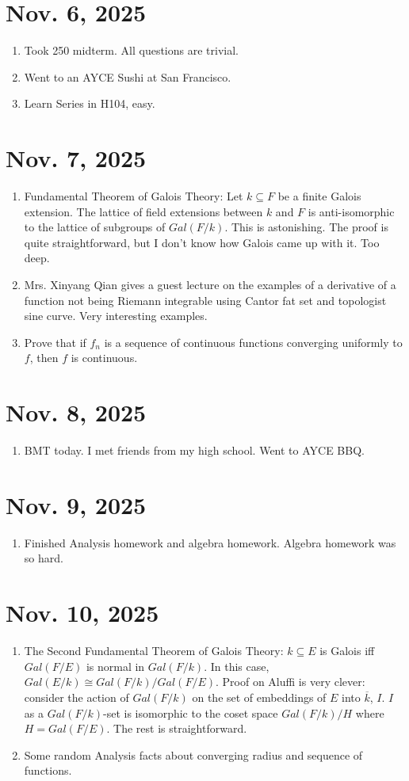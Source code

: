 \documentclass[15pt]{scrartcl}
\begin{document}
\section{Nov. 6, 2025}
\begin{enumerate}
\item Took 250 midterm. All questions are trivial. 
\item Went to an AYCE Sushi at San Francisco.
\item Learn Series in H104, easy. 
\end{enumerate}
\section{Nov. 7, 2025}
\begin{enumerate}
\item Fundamental Theorem of Galois Theory: Let $k\subseteq F$ be a finite Galois extension. The lattice of field extensions between $k$ and $F$ is anti-isomorphic to the lattice of subgroups of $Gal(F/k)$. This is astonishing. The proof is quite straightforward, but I don't know how Galois came up with it. Too deep.  
\item Mrs. Xinyang Qian gives a guest lecture on the examples of a derivative of a function not being Riemann integrable using Cantor fat set and topologist sine curve. Very interesting examples. 
\item Prove that if $f_n$ is a sequence of continuous functions converging uniformly to $f$, then $f$ is continuous. 
\end{enumerate}
\section{Nov. 8, 2025}
\begin{enumerate}
    \item BMT today. I met friends from my high school. Went to AYCE BBQ.
\end{enumerate}
\section{Nov. 9, 2025}
\begin{enumerate}
    \item Finished Analysis homework and algebra homework. Algebra homework was so hard. 
\end{enumerate}
\section{Nov. 10, 2025}
\begin{enumerate}
\item The Second Fundamental Theorem of Galois Theory: $k\subseteq E$ is Galois iff $Gal(F/E)$ is normal in $Gal(F/k)$. In this case, $Gal(E/k)\cong Gal(F/k)/Gal(F/E)$. Proof on Aluffi is very clever: consider the action of $Gal(F/k)$ on the set of embeddings of $E$ into $\overline{k}$, $I$. $I$ as a $Gal(F/k)$-set is isomorphic to the coset space $Gal(F/k)/H$ where $H=Gal(F/E)$. The rest is straightforward.
\item Some random Analysis facts about converging radius and sequence of functions. 
\end{enumerate}
\end{document}
